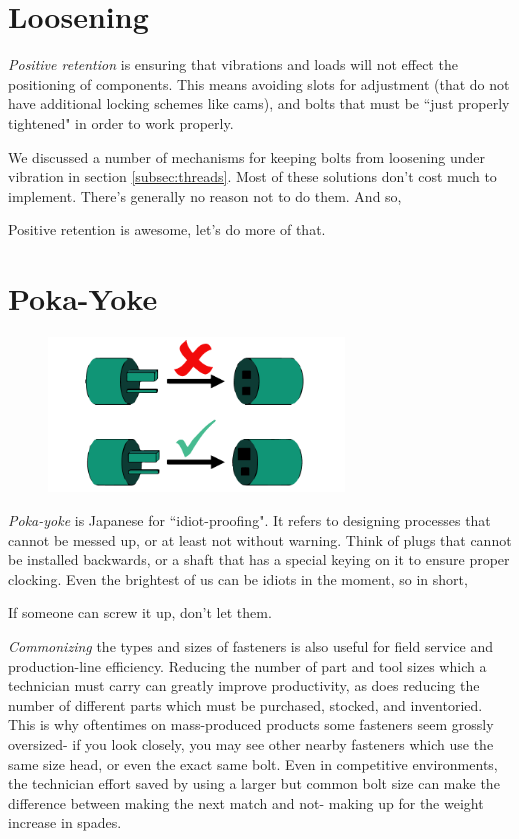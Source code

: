 \section{Loosening}

\textit{Positive retention} is ensuring that vibrations and loads will not effect the positioning of components. This means avoiding slots for adjustment (that do not have additional locking schemes like cams), and bolts that must be ``just properly tightened" in order to work properly.

We discussed a number of mechanisms for keeping bolts from loosening under vibration in section \ref{subsec:threads}. Most of these solutions don't cost much to implement. There's generally no reason not to do them. And so,

\begin{theorem}
Positive retention is awesome, let's do more of that.
\end{theorem}

\section{Poka-Yoke}

\begin{figure}[H]
	\includegraphics[width=0.7\textwidth]{imgs/poka_yoke.png}
\end{figure}

\textit{Poka-yoke} is Japanese for ``idiot-proofing". It refers to designing processes that cannot be messed up, or at least not without warning. Think of plugs that cannot be installed backwards, or a shaft that has a special keying on it to ensure proper clocking. Even the brightest of us can be idiots in the moment, so in short,

\begin{theorem}
If someone can screw it up, don't let them.
\end{theorem}	

\textit{Commonizing} the types and sizes of fasteners is also useful for field service and production-line efficiency. Reducing the number of part and tool sizes which a technician must carry can greatly improve productivity, as does reducing the number of different parts which must be purchased, stocked, and inventoried. This is why oftentimes on mass-produced products some fasteners seem grossly oversized- if you look closely, you may see other nearby fasteners which use the same size head, or even the exact same bolt. Even in competitive environments, the technician effort saved by using a larger but common bolt size can make the difference between making the next match and not- making up for the weight increase in spades.


